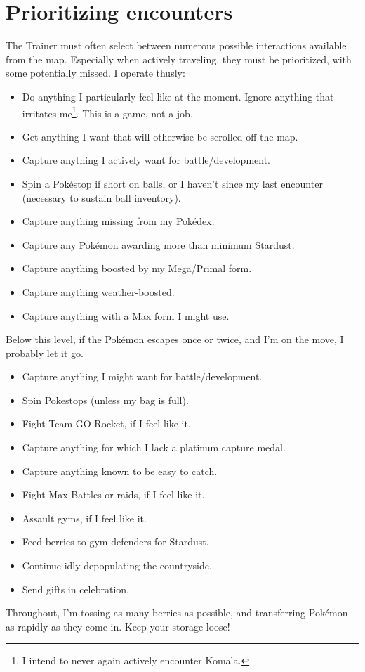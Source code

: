 \section{Prioritizing encounters\label{sec:prioritymap}}
The Trainer must often select between numerous possible interactions available from the map.
Especially when actively traveling, they must be prioritized, with some potentially missed.
I operate thusly:
\begin{itemize}
\item Do anything I particularly feel like at the moment.
      Ignore anything that irritates me\footnote{I intend to never again actively encounter Komala.}.
      This is a game, not a job.
\item Get anything I want that will otherwise be scrolled off the map.
\item Capture anything I actively want for battle/development.
\item Spin a Pokéstop if short on balls, or I haven't since my last encounter (necessary to sustain ball inventory).
\item Capture anything missing from my Pokédex.
\item Capture any Pokémon awarding more than minimum Stardust.
\item Capture anything boosted by my Mega/Primal form.
\item Capture anything weather-boosted.
\item Capture anything with a Max form I might use.
\end{itemize}
Below this level, if the Pokémon escapes once or twice, and I'm on the move,
I probably let it go.
\begin{itemize}
\item Capture anything I might want for battle/development.
\item Spin Pokestops (unless my bag is full).
\item Fight Team GO Rocket, if I feel like it.
\item Capture anything for which I lack a platinum capture medal.
\item Capture anything known to be easy to catch.
\item Fight Max Battles or raids, if I feel like it.
\item Assault gyms, if I feel like it.
\item Feed berries to gym defenders for Stardust.
\item Continue idly depopulating the countryside.
\item Send gifts in celebration.
\end{itemize}
Throughout, I'm tossing as many berries as possible, and
 transferring Pokémon as rapidly as they come in.
Keep your storage loose!

